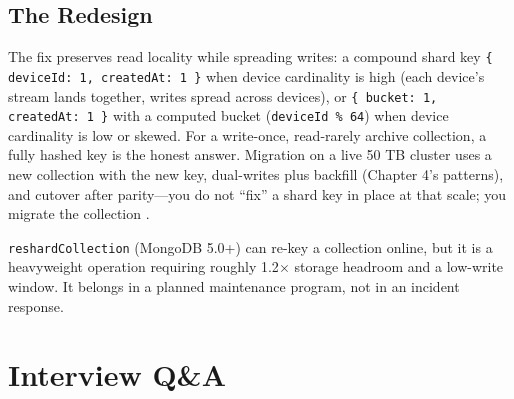 \subsection{The Redesign}
The fix preserves read locality while spreading writes: a compound shard key \texttt{\{ deviceId: 1, createdAt: 1 \}} when device cardinality is high (each device's stream lands together, writes spread across devices), or \texttt{\{ bucket: 1, createdAt: 1 \}} with a computed bucket (\texttt{deviceId \% 64}) when device cardinality is low or skewed. For a write-once, read-rarely archive collection, a fully hashed key is the honest answer. Migration on a live 50 TB cluster uses a new collection with the new key, dual-writes plus backfill (Chapter 4's patterns), and cutover after parity---you do not ``fix'' a shard key in place at that scale; you migrate the collection \cite{mongodbShardingDocs}.

\begin{notebox}
\texttt{reshardCollection} (MongoDB 5.0+) can re-key a collection online, but it is a heavyweight operation requiring roughly 1.2$\times$ storage headroom and a low-write window. It belongs in a planned maintenance program, not in an incident response.
\end{notebox}

\section{Interview Q\&A}
